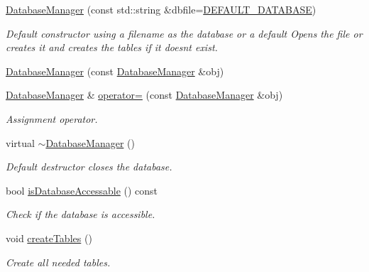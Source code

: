 \begin{DoxyCompactItemize}
\item 
\hyperlink{classcryomesh_1_1manager_1_1DatabaseManager_a5dbfbb7dd102cdc96d76992eda32fc2d}{\-Database\-Manager} (const std\-::string \&dbfile=\hyperlink{classcryomesh_1_1manager_1_1DatabaseManager_a83c6bbd218ba8c1b5e7391e60b933fe9}{\-D\-E\-F\-A\-U\-L\-T\-\_\-\-D\-A\-T\-A\-B\-A\-S\-E})
\begin{DoxyCompactList}\small\item\em \-Default constructor using a filename as the database or a default \-Opens the file or creates it and creates the tables if it doesnt exist. \end{DoxyCompactList}\item 
\hyperlink{classcryomesh_1_1manager_1_1DatabaseManager_af923abab509958feea706f57c8a9cd81}{\-Database\-Manager} (const \hyperlink{classcryomesh_1_1manager_1_1DatabaseManager}{\-Database\-Manager} \&obj)
\item 
\hyperlink{classcryomesh_1_1manager_1_1DatabaseManager}{\-Database\-Manager} \& \hyperlink{classcryomesh_1_1manager_1_1DatabaseManager_a50fcb1a1aa55a3330ddc189e65bd46d4}{operator=} (const \hyperlink{classcryomesh_1_1manager_1_1DatabaseManager}{\-Database\-Manager} \&obj)
\begin{DoxyCompactList}\small\item\em \-Assignment operator. \end{DoxyCompactList}\item 
virtual \hyperlink{classcryomesh_1_1manager_1_1DatabaseManager_a776fd73e7daa1dd6aa222daf6398b7cf}{$\sim$\-Database\-Manager} ()
\begin{DoxyCompactList}\small\item\em \-Default destructor closes the database. \end{DoxyCompactList}\item 
bool \hyperlink{classcryomesh_1_1manager_1_1DatabaseManager_ad486e95ee9d6542ad72f91047abbc98a}{is\-Database\-Accessable} () const 
\begin{DoxyCompactList}\small\item\em \-Check if the database is accessible. \end{DoxyCompactList}\item 
void \hyperlink{classcryomesh_1_1manager_1_1DatabaseManager_a7a21be3e6475e8e0bbb831a152438db9}{create\-Tables} ()
\begin{DoxyCompactList}\small\item\em \-Create all needed tables. \end{DoxyCompactList}\item 

\end{DoxyCompactItemize}
